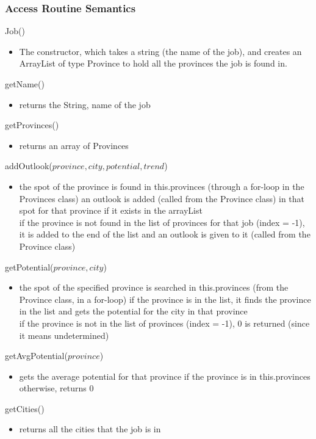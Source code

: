 \documentclass[12pt,fleqn]{article}
\begin{document}
\subsubsection*{Access Routine Semantics}
\noindent Job()
\begin{itemize}
\item The constructor, which takes a string (the name of the job), and creates an ArrayList of type Province to
hold all the provinces the job is found in.
\end{itemize}
\noindent getName()
\begin{itemize}
\item returns the String, name of the job
\end{itemize}
\noindent getProvinces()
\begin{itemize}
\item returns an array of Provinces
\end{itemize}
\noindent addOutlook($province, city, potential, trend$)
\begin{itemize}
\item the spot of the province is found in this.provinces (through a for-loop in the Provinces class)
an outlook is added (called from the Province class) in that spot for that province if it exists in the
arrayList
\\if the province is not found in the list of provinces for that job (index = -1), it is added to the end of the
list and an outlook is given to it (called from the Province class)
\end{itemize}
\noindent getPotential($province, city$)
\begin{itemize}
\item the spot of the specified province is searched in this.provinces (from the Province class, in a for-loop)
if the province is in the list, it finds the province in the list and gets the potential for the city in that
province\\
if the province is not in the list of provinces (index = -1), 0 is returned (since it means undetermined)
\end{itemize}
\noindent getAvgPotential($province$)
\begin{itemize}
\item gets the average potential for that province if the province is in this.provinces
otherwise, returns 0
\end{itemize}
\noindent getCities()
\begin{itemize}
\item returns all the cities that the job is in
\end{itemize}
\end{document}
